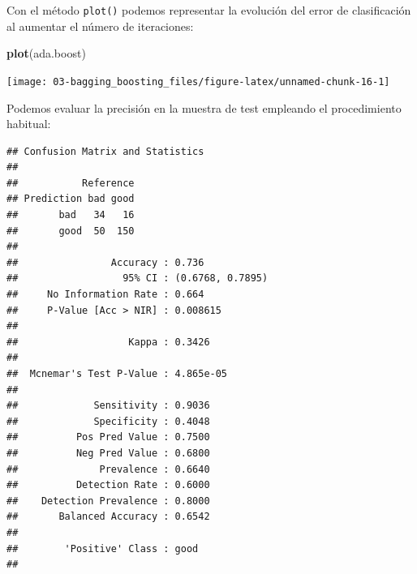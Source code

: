 \documentclass[
]{book}
\newenvironment{Shaded}{\begin{snugshade}}{\end{snugshade}}
\newcommand{\DataTypeTok}[1]{\textcolor[rgb]{0.13,0.29,0.53}{#1}}
\newcommand{\KeywordTok}[1]{\textcolor[rgb]{0.13,0.29,0.53}{\textbf{#1}}}
\newcommand{\NormalTok}[1]{#1}
\newcommand{\OperatorTok}[1]{\textcolor[rgb]{0.81,0.36,0.00}{\textbf{#1}}}
\newcommand{\StringTok}[1]{\textcolor[rgb]{0.31,0.60,0.02}{#1}}
\theoremstyle{break}
\theoremstyle{definition}
\theoremstyle{definition}
\theoremstyle{definition}
\theoremstyle{remark}
\begin{document}
Con el método \texttt{plot()} podemos representar la evolución del error de clasificación al aumentar el número de iteraciones:

\begin{Shaded}
\begin{Highlighting}[]
\KeywordTok{plot}\NormalTok{(ada.boost)}
\end{Highlighting}
\end{Shaded}

\begin{center}\texttt{[image: 03-bagging\_boosting\_files/figure-latex/unnamed-chunk-16-1]} \end{center}

Podemos evaluar la precisión en la muestra de test empleando el procedimiento habitual:

\begin{Shaded}
\end{Shaded}

\begin{verbatim}
## Confusion Matrix and Statistics
## 
##           Reference
## Prediction bad good
##       bad   34   16
##       good  50  150
##                                           
##                Accuracy : 0.736           
##                  95% CI : (0.6768, 0.7895)
##     No Information Rate : 0.664           
##     P-Value [Acc > NIR] : 0.008615        
##                                           
##                   Kappa : 0.3426          
##                                           
##  Mcnemar's Test P-Value : 4.865e-05       
##                                           
##             Sensitivity : 0.9036          
##             Specificity : 0.4048          
##          Pos Pred Value : 0.7500          
##          Neg Pred Value : 0.6800          
##              Prevalence : 0.6640          
##          Detection Rate : 0.6000          
##    Detection Prevalence : 0.8000          
##       Balanced Accuracy : 0.6542          
##                                           
##        'Positive' Class : good            
## 
\end{verbatim}
\end{document}
